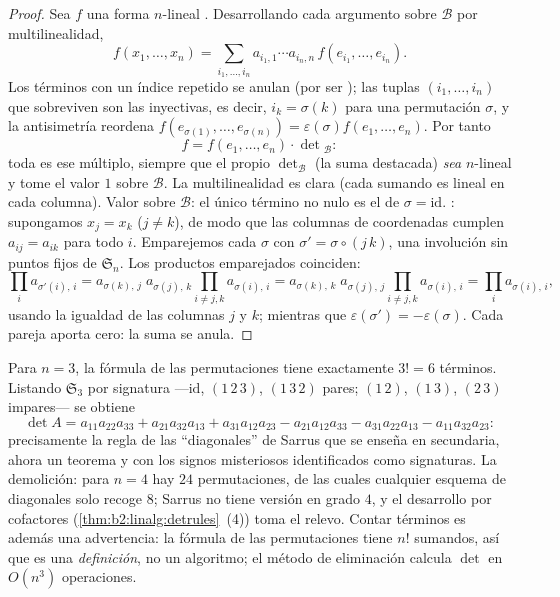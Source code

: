 \begin{proof}
Sea $f$ una forma $n$-lineal . Desarrollando cada argumento
sobre $\mathcal{B}$ por multilinealidad,
\[
f(x_1, \dots, x_n)
= \sum_{i_1, \dots, i_n} a_{i_1,1}\cdots a_{i_n,n}\,
f(e_{i_1}, \dots, e_{i_n}).
\]
Los términos con un índice repetido se anulan (por ser );
las tuplas $(i_1, \dots, i_n)$ que sobreviven son las inyectivas, es
decir, $i_k = \sigma(k)$ para una permutación $\sigma$, y la
antisimetría reordena $f(e_{\sigma(1)}, \dots, e_{\sigma(n)}) =
\varepsilon(\sigma) f(e_1, \dots, e_n)$. Por tanto
\[
f = f(e_1, \dots, e_n) \cdot \det{}_{\mathcal{B}} :
\]
toda  es ese múltiplo, siempre que el propio
$\det_{\mathcal{B}}$ (la suma destacada) \emph{sea} $n$-lineal
 y tome el valor $1$ sobre $\mathcal B$. La
multilinealidad es clara (cada sumando es lineal en cada columna).
Valor sobre $\mathcal B$: el único término no nulo es el de $\sigma
= \mathrm{id}$. : supongamos $x_j = x_k$ ($j \neq k$),
de modo que las columnas de coordenadas cumplen $a_{i j} = a_{i k}$
para todo $i$. Emparejemos cada $\sigma$ con $\sigma' =
\sigma\circ(j\,k)$, una involución sin puntos fijos de
$\mathfrak{S}_n$. Los productos emparejados coinciden:
\[
\prod_i a_{\sigma'(i),\,i}
= a_{\sigma(k),\,j}\; a_{\sigma(j),\,k}
\prod_{i \neq j,k} a_{\sigma(i),\,i}
= a_{\sigma(k),\,k}\; a_{\sigma(j),\,j}
\prod_{i \neq j,k} a_{\sigma(i),\,i}
= \prod_i a_{\sigma(i),\,i},
\]
usando la igualdad de las columnas $j$ y $k$; mientras que
$\varepsilon(\sigma') = -\varepsilon(\sigma)$. Cada pareja aporta
cero: la suma se anula.
\end{proof}

\begin{example}\label{ex:b2:linalg:sarrus}
Para $n = 3$, la fórmula de las permutaciones tiene exactamente $3!
= 6$ términos. Listando $\mathfrak{S}_3$ por signatura
---$\mathrm{id}$, $(1\,2\,3)$, $(1\,3\,2)$ pares; $(1\,2)$,
$(1\,3)$, $(2\,3)$ impares--- se obtiene
\[
\det A = a_{11}a_{22}a_{33} + a_{21}a_{32}a_{13} +
a_{31}a_{12}a_{23}
- a_{21}a_{12}a_{33} - a_{31}a_{22}a_{13} -
a_{11}a_{32}a_{23} :
\]
precisamente la regla de las ``diagonales'' de Sarrus que se
enseña en secundaria, ahora un teorema y con los signos
misteriosos identificados como signaturas. La demolición: para $n
= 4$ hay $24$ permutaciones, de las cuales cualquier esquema de
diagonales solo recoge $8$; Sarrus no tiene versión en grado $4$, y
el desarrollo por cofactores (\cref{thm:b2:linalg:detrules}~(4))
toma el relevo. Contar términos es además una advertencia: la
fórmula de las permutaciones tiene $n!$ sumandos, así que es una
\emph{definición}, no un algoritmo; el método de eliminación
calcula $\det$ en $O(n^3)$ operaciones.
\end{example}

